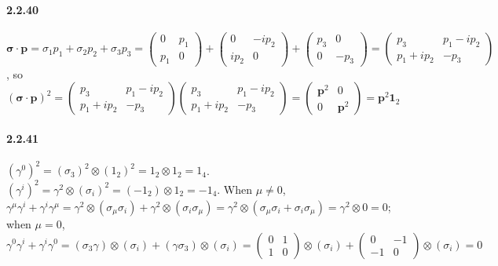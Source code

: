 \documentclass[a4paper]{article}
\begin{document}
\paragraph{2.2.40}
$\boldsymbol{\sigma}\cdot\mathbf{p}=\sigma_1p_1+\sigma_2p_2+\sigma_3p_3=
\begin{pmatrix}
0&p_1\\p_1&0
\end{pmatrix}+
\begin{pmatrix}
0&-ip_2\\ip_2&0
\end{pmatrix}+
\begin{pmatrix}
p_3&0\\0&-p_3
\end{pmatrix}=
\begin{pmatrix}
p_3&p_1-ip_2\\p_1+ip_2&-p_3
\end{pmatrix}
$,
so $(\boldsymbol{\sigma}\cdot\mathbf{p})^2=\begin{pmatrix}
p_3&p_1-ip_2\\p_1+ip_2&-p_3
\end{pmatrix}\begin{pmatrix}
p_3&p_1-ip_2\\p_1+ip_2&-p_3
\end{pmatrix}=
\begin{pmatrix}
\mathbf{p}^2&0\\0&\mathbf{p}^2
\end{pmatrix}=\mathbf{p}^2\mathbf{1}_2
$

\paragraph{2.2.41}
$(\gamma^0)^2=(\sigma_3)^2\otimes(1_2)^2=1_2\otimes1_2=1_4$. $(\gamma^i)^2=\gamma^2\otimes(\sigma_i)^2=(-1_2)\otimes1_2=-1_4$. When $\mu\neq0$, $\gamma^\mu\gamma^i+\gamma^i\gamma^\mu=\gamma^2\otimes(\sigma_\mu\sigma_i)+\gamma^2\otimes(\sigma_i\sigma_\mu)=\gamma^2\otimes(\sigma_\mu\sigma_i+\sigma_i\sigma_\mu)=\gamma^2\otimes0=0$; when $\mu=0$, $\gamma^0\gamma^i+\gamma^i\gamma^0=(\sigma_3\gamma)\otimes(\sigma_i)+(\gamma\sigma_3)\otimes(\sigma_i)=
\begin{pmatrix}0&1\\1&0\end{pmatrix}\otimes(\sigma_i)+
\begin{pmatrix}0&-1\\-1&0\end{pmatrix}\otimes(\sigma_i)=0
$
\end{document}
